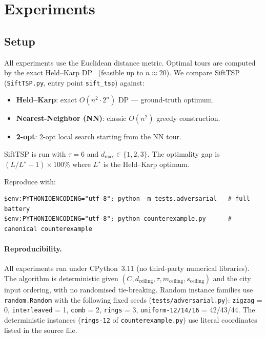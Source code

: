 \documentclass[11pt,a4paper]{article}
\begin{document}
\section{Experiments}

\subsection{Setup}

All experiments use the Euclidean distance metric. Optimal tours are
computed by the exact Held--Karp DP~\cite{heldkarp1962} (feasible up to $n \approx 20$).
We compare SiftTSP (\texttt{SiftTSP.py}, entry point \texttt{sift\_tsp})
against:

\begin{itemize}
\item \textbf{Held--Karp}: exact $O(n^2 \cdot 2^n)$ DP --- ground-truth
optimum.
\item \textbf{Nearest-Neighbor (NN)}: classic $O(n^2)$ greedy
construction.
\item \textbf{2-opt}: 2-opt local search starting from the NN tour.
\end{itemize}

SiftTSP is run with $\tau = 6$ and $d_{\max} \in \{1, 2, 3\}$. The
optimality gap is $(L / L^{\star} - 1) \times 100\%$ where $L^{\star}$ is
the Held--Karp optimum.

Reproduce with:
\begin{small}
\begin{verbatim}
$env:PYTHONIOENCODING="utf-8"; python -m tests.adversarial   # full battery
$env:PYTHONIOENCODING="utf-8"; python counterexample.py      # canonical counterexample
\end{verbatim}
\end{small}

\paragraph{Reproducibility.} All experiments run under CPython~3.11 (no
third-party numerical libraries). The algorithm is deterministic given
$(C, d_{\text{ceiling}}, \tau, m_{\text{ceiling}}, s_{\text{ceiling}})$
and the city input ordering, with no randomised tie-breaking. Random
instance families use \texttt{random.Random} with the following fixed
seeds (\texttt{tests/adversarial.py}): \texttt{zigzag} = 0,
\texttt{interleaved} = 1, \texttt{comb} = 2, \texttt{rings} = 3,
\texttt{uniform-12/14/16} = 42/43/44. The deterministic instances
(\texttt{rings-12} of \texttt{counterexample.py}) use literal
coordinates listed in the source file.
\end{document}
